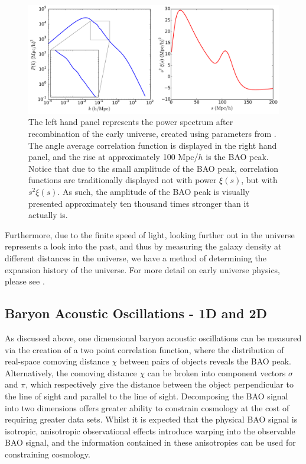 \documentclass[titlesmallcaps, examinerscopy, copyrightpage]{uqthesis}
\begin{document}
\begin{figure}[h!]
  \begin{center}
    \includegraphics[width=\textwidth]{images/Backgroundpk2xi.pdf}
  \end{center}
  \caption{The left hand panel represents the power spectrum after recombination of the early universe, created using parameters from \citet{Planck201416}. The angle average correlation function is displayed in the right hand panel, and the rise at approximately 100 Mpc/$h$ is the BAO peak. Notice that due to the small amplitude of the BAO peak, correlation functions are traditionally displayed not with power $\xi(s)$, but with $s^2 \xi(s)$. As such, the amplitude of the BAO peak is visually presented approximately ten thousand times stronger than it actually is.}
  \label{fig:Backgroundpk2xi}
\end{figure}



Furthermore, due to the finite speed of light, looking further out in the universe represents a look into the past, and thus by measuring the galaxy density at different distances in the universe, we have a method of determining the expansion history of the universe. For more detail on early universe physics, please see \citet{BashinskyBertschinger2001,BashinskyBertschinger2002}.



\subsection{Baryon Acoustic Oscillations - 1D and 2D}

As discussed above, one dimensional baryon acoustic oscillations can be measured via the creation of a two point correlation function, where the distribution of real-space comoving distance $\chi$ between pairs of objects reveals the BAO peak. Alternatively, the comoving distance $\chi$ can be broken into component vectors $\sigma$ and $\pi$, which respectively give the distance between the object perpendicular to the line of sight and parallel to the line of sight. Decomposing the BAO signal into two dimensions offers greater ability to constrain cosmology at the cost of requiring greater data sets. Whilst it is expected that the physical BAO signal is isotropic, anisotropic observational effects introduce warping into the observable BAO signal, and the information contained in these anisotropies can be used for constraining cosmology. 
\end{document}
